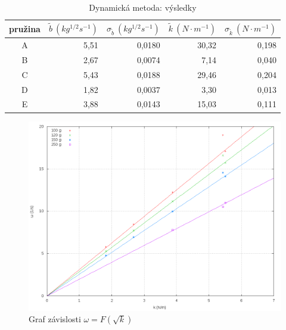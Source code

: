 \documentclass{article}
\begin{document}
\begin{table}[htbp]
\begin{center}
\begin{tabular}{|c|r|r|r|r|}
\hline
pružina & \multicolumn{1}{c|}{$ \tilde{b} ~(kg^{1/2}s^{-1})    $} & \multicolumn{1}{c|}{$  \sigma _{\tilde{b}}   ~(kg^{1/2}s^{-1})   $}
 & \multicolumn{1}{c|}{$ \tilde{k}  ~(N \cdot m^{-1})           $}
  & \multicolumn{1}{c|}{$ \sigma _{\tilde{k}}  ~(N\cdot m^{-1})           $} \\ \hline
A & 5,51 & 0,0180 & 30,32 & 0,198 \\ \hline
B & 2,67 & 0,0074 & 7,14 & 0,040 \\ \hline
C & 5,43 & 0,0188 & 29,46 & 0,204 \\ \hline
D & 1,82 & 0,0037 & 3,30 & 0,013 \\ \hline
E & 3,88 & 0,0143 & 15,03 & 0,111 \\ \hline
\end{tabular}
\caption{Dynamická metoda: výsledky}
\label{tdynvysl}
\end{center}
\end{table}


\begin{figure} \label{gwk} 
\centering
\includegraphics[width=\textwidth]{gwk}
\caption{Graf závislosti $ \omega = F(\sqrt{k}) $}
\end{figure} 
\end{document}
